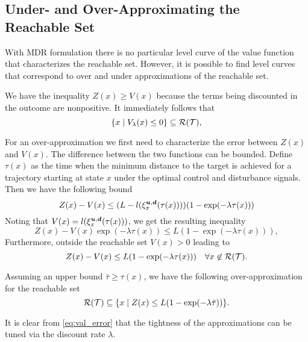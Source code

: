 \subsection{Under- and Over-Approximating the Reachable Set}
With MDR formulation there is no particular level curve of the value function that characterizes the reachable set. However, it is possible to find level curves that correspond to over and under approximations of the reachable set. 

We have the inequality $Z(x) \geq V(x)$ because the terms being discounted in the outcome are nonpositive. It immediately follows that
%
\begin{equation} \label{eq:reach_set}
\{x \mid V_{\lambda}(x) \le 0\} \subseteq \mathcal{R}(\mathcal{T}),
\end{equation}  

For an over-approximation we first need to characterize the error between $Z(x)$ and $V(x)$. The difference between the two functions can be bounded. Define $\tau(x)$ as the time when the minimum distance to the target is achieved for a trajectory starting at state $x$ under the optimal control and disturbance signals. Then we have the following bound
%
\begin{equation}
Z(x) - V(x)  \leq (L - l(\xi_{x}^{\bm{u},\bm{d}}(\tau(x))))( 1 -  \exp(-\lambda \tau(x))) 
\end{equation}%
\noindent Noting that $V(x)=l(\xi_{x}^{\bm{u},\bm{d}}(\tau(x)))$, we get the resulting inequality
%
\begin{equation} \label{eq:val_error}
Z(x) -  V(x) \exp(-\lambda \tau(x)) \leq L( 1 -  \exp(-\lambda \tau(x))), 
\end{equation}%
\noindent Furthermore, outside the reachable set $V(x)>0$ leading to
%
\begin{equation}
Z(x) -  V(x)  \leq L( 1 -  \exp(-\lambda \tau(x))) \quad \forall x \not\in \mathcal{R}(\mathcal{T}).
\end{equation}

Assuming an upper bound  ${\bar{\tau} \geq \tau(x)}$, we have the following over-approximation for the reachable set
%
\begin{equation} \label{eq:reach_set}
\mathcal{R}(\mathcal{T}) \subseteq  \{x \mid Z(x) \le L( 1 -  \exp(-\lambda \bar{\tau})) \}.
\end{equation} 

It is clear from \eqref{eq:val_error} that the tightness of the approximations can be tuned via the discount rate $\lambda$.
